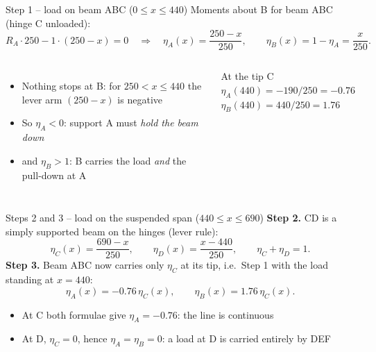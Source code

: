 \documentclass[aspectratio=169,11pt]{beamer}
\newcommand{\il}[1]{\eta_{#1}}
\begin{document}
\begin{frame}{Step 1 -- load on beam ABC ($0 \le x \le 440$)}
Moments about B for beam ABC (hinge C unloaded):
\[
  R_A \cdot 250 - 1\cdot(250 - x) = 0 \quad\Longrightarrow\quad \il{A}(x) = \frac{250 - x}{250}, \qquad \il{B}(x) = 1 - \il{A} = \frac{x}{250}.
\]
\begin{columns}[T]
\begin{itemize}
  \item Nothing stops at B: for $250 < x \le 440$ the lever arm $(250 - x)$ is \alert{negative}
  \item So $\il{A} < 0$: support A must \emph{hold the beam down}
  \item and $\il{B} > 1$: B carries the load \emph{and} the pull-down at A
\end{itemize}
\begin{block}{At the tip C}
$\il{A}(440) = -190/250 = \mathbf{-0.76}$\\
$\il{B}(440) = 440/250 = \mathbf{1.76}$
\end{block}
\end{columns}
\end{frame}

\begin{frame}{Steps 2 and 3 -- load on the suspended span ($440 \le x \le 690$)}
\textbf{Step 2.} CD is a simply supported beam on the hinges (lever rule):
\[
  \il{C}(x) = \frac{690 - x}{250}, \qquad \il{D}(x) = \frac{x - 440}{250}, \qquad \il{C} + \il{D} = 1.
\]
\textbf{Step 3.} Beam ABC now carries only $\il{C}$ at its tip, i.e.\ Step 1 with the load standing at $x = 440$:
\[
  \il{A}(x) = -0.76\,\il{C}(x), \qquad \il{B}(x) = 1.76\,\il{C}(x).
\]
\begin{itemize}
  \item At C both formulae give $\il{A} = -0.76$: the line is \alert{continuous}
  \item At D, $\il{C} = 0$, hence $\il{A} = \il{B} = 0$: a load at D is carried entirely by DEF
\end{itemize}
\end{frame}
\end{document}

